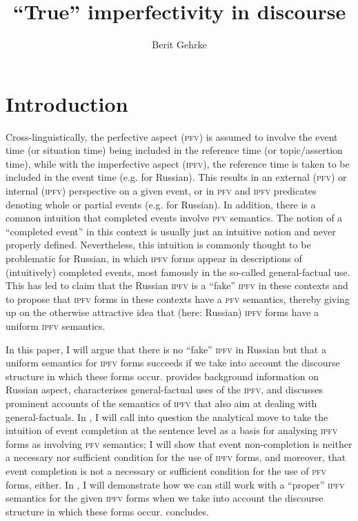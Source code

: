 \documentclass[output=paper]{langscibook}
\author{Berit Gehrke\affiliation{Humboldt-Universität zu Berlin}}
\title{“True” imperfectivity in discourse}
\begin{document}
\maketitle

\section{Introduction}\label{gehr:sec:intro}

Cross-linguistically, the perfective aspect (\textsc{pfv}) is assumed to involve the event time (or situation time) being included in the reference time (or topic/assertion time), while with the imperfective aspect (\textsc{ipfv}), the reference time is taken to be included in the event time (e.g. \citealt{klein95} for Russian). This results in an external (\textsc{pfv}) or internal (\textsc{ipfv}) perspective on a given event, or in \textsc{pfv} and \textsc{ipfv} predicates denoting whole or partial events (e.g. \citealt{filip99, altshuler14} for Russian). In addition, there is a common intuition that completed events involve \textsc{pfv} semantics. The notion of a ``completed event'' in this context is usually just an intuitive notion and never properly defined. Nevertheless, this intuition is commonly thought to be problematic for Russian, in which \textsc{ipfv} forms appear in descriptions of (intuitively) completed events, most famously in the so-called general-factual use. This has led \citet{gronn15} to claim that the Russian \textsc{ipfv} is a ``fake'' \textsc{ipfv} in these contexts %
and to propose that \textsc{ipfv} forms in these contexts have a \textsc{pfv} semantics, thereby giving up on the otherwise attractive idea that (here: Russian) \textsc{ipfv} forms have a uniform \textsc{ipfv} semantics. 

In this paper, I will argue that there is no ``fake'' \textsc{ipfv} in Russian but that a uniform semantics for \textsc{ipfv} forms succeeds if we take into account the discourse structure in which these forms occur.  provides background information on Russian aspect, characterises general-factual uses of the \textsc{ipfv}, and discusses prominent accounts of the semantics of \textsc{ipfv} that also aim at dealing with general-factuals. In , I will call into question the analytical move to take the intuition of event completion at the sentence level as a basis for analysing \textsc{ipfv} forms as involving \textsc{pfv} semantics; I will show that event non-completion is neither a necessary nor sufficient condition for the use of \textsc{ipfv} forms, and moreover, that event completion is not a necessary or sufficient condition for the use of \textsc{pfv} forms, either. In , I will demonstrate how we can still work with a ``proper'' \textsc{ipfv} semantics for the given \textsc{ipfv} forms when we take into account the discourse structure in which these forms occur.  concludes.
\end{document}
